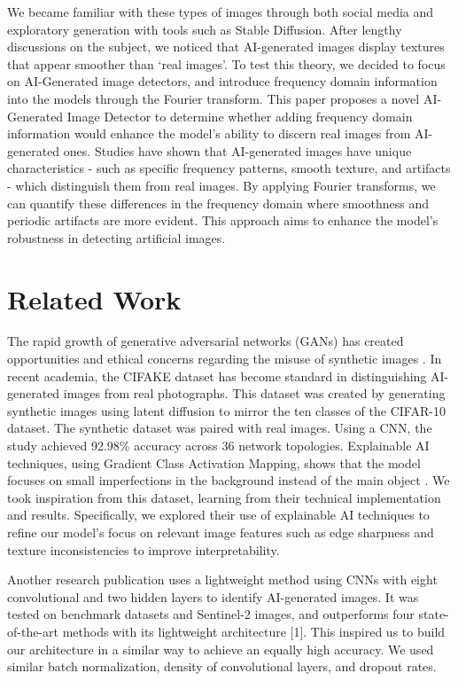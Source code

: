 We became familiar with these types of images through both social media and exploratory generation with tools such as Stable Diffusion. After lengthy discussions on the subject, we noticed that AI-generated images display textures that appear smoother than ‘real images’. To test this theory, we decided to focus on AI-Generated image detectors, and introduce frequency domain information into the models through the Fourier transform. This paper proposes a novel AI-Generated Image Detector to determine whether adding frequency domain information would enhance the model’s ability to discern real images from AI-generated ones. Studies have shown that AI-generated images have unique characteristics - such as specific frequency patterns, smooth texture, and artifacts - which distinguish them from real images. By applying Fourier transforms, we can quantify these differences in the frequency domain where smoothness and periodic artifacts are more evident. This approach aims to enhance the model's robustness in detecting artificial images.

\section{Related Work}

The rapid growth of generative adversarial networks (GANs) has created opportunities and ethical concerns regarding the misuse of synthetic images \cite{2, 3, 6}. In recent academia, the CIFAKE dataset has become standard in distinguishing AI-generated images from real photographs. This dataset was created by generating synthetic images using latent diffusion to mirror the ten classes of the CIFAR-10 dataset. The synthetic dataset was paired with real images. Using a CNN, the study achieved 92.98\% accuracy across 36 network topologies. Explainable AI techniques, using Gradient Class Activation Mapping, shows that the model focuses on small imperfections in the background instead of the main object \cite{5}. We took inspiration from this dataset, learning from their technical implementation and results. Specifically, we explored their use of explainable AI techniques to refine our model's focus on relevant image features such as edge sharpness and texture inconsistencies to improve interpretability.
 
Another research publication uses a lightweight method using CNNs with eight convolutional and two hidden layers to identify AI-generated images. It was tested on benchmark datasets and Sentinel-2 images, and outperforms four state-of-the-art methods with its lightweight architecture [1]. This inspired us to build our architecture in a similar way to achieve an equally high accuracy. We used similar batch normalization, density of convolutional layers, and dropout rates. 

